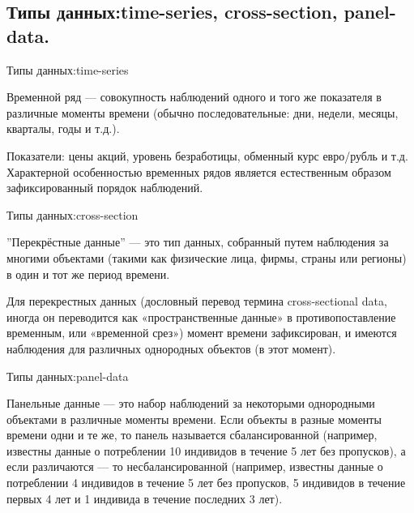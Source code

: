 \documentclass{beamer}
\begin{document}
\subsection{Типы данных:time-series, cross-section,  panel-data.} 


\begin{frame}{Типы данных:time-series} 

Временной ряд — совокупность наблюдений одного и того же показателя в различные моменты времени 
(обычно последовательные: дни, недели, месяцы, кварталы, годы и т.д.).

Показатели: цены акций, уровень безработицы, обменный курс евро/рубль и т.д. 
Характерной особенностью временных рядов является естественным образом зафиксированный порядок наблюдений. 


\end{frame}




\begin{frame}{Типы данных:cross-section}

''Перекрёстные данные'' — это тип данных, собранный путем наблюдения за многими объектами 
(такими как физические лица, фирмы, страны или регионы) в один и тот же период времени.

Для перекрестных данных (дословный перевод термина cross-sectional data, 
иногда он переводится как «пространственные данные» в противопоставление временным, или «временной срез») 
момент времени зафиксирован, и имеются наблюдения для различных однородных объектов (в этот момент). 
\end{frame}

\begin{frame}{Типы данных:panel-data} 

Панельные данные —  это набор наблюдений за некоторыми однородными объектами в различные моменты времени. 
Если объекты в разные моменты времени одни и те же, то панель называется сбалансированной 
(например, известны данные о потреблении 10 индивидов в течение 5 лет без пропусков),
 а если различаются — то несбалансированной (например, известны данные о потреблении 4 индивидов в течение 
 5 лет без пропусков, 5 индивидов в течение первых 4 лет и 1 индивида в течение последних 3 лет). 
 
\end{frame}
\end{document}
